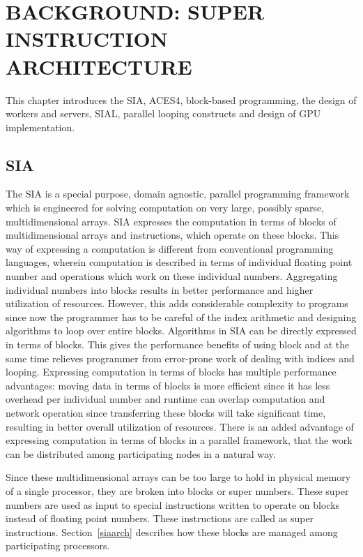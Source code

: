 \chapter{BACKGROUND: SUPER INSTRUCTION ARCHITECTURE} \label{background}

This chapter introduces the SIA, ACES4, block-based
programming, the design of workers and servers, SIAL, parallel looping constructs
and design of GPU implementation.

\section{SIA}
The SIA is a special purpose, domain agnostic, parallel programming framework which
is engineered for solving computation on very large, possibly sparse, multidimensional
arrays. SIA expresses the computation in terms of blocks of multidimensional arrays
and instructions, which operate on these blocks. This way of expressing a computation
is different from conventional programming
languages, wherein computation is described in terms of individual floating point
number and operations which work on these individual numbers. Aggregating
individual numbers into blocks results in better performance and higher utilization
of resources. However, this adds considerable complexity to programs since now
the programmer has to be careful of the index arithmetic and designing algorithms to loop
over entire blocks. Algorithms in SIA can be directly expressed in terms of
blocks. This gives the performance benefits of using block and at the same time relieves
programmer from error-prone work of dealing with indices and looping. Expressing
computation in terms of blocks has multiple performance advantages: moving data in terms
of blocks is more efficient since it has less overhead per individual number
and runtime can overlap computation and network operation since transferring these
blocks will take significant time, resulting in better overall utilization of resources.
There is an added advantage of expressing computation in terms of blocks in a parallel
framework, that the work can be distributed among participating nodes in a natural
way.

Since these multidimensional arrays can be too
large to hold in physical memory of a single processor, they are broken into
blocks or super numbers. These super numbers are used as input to special instructions
written to operate on blocks instead of floating point numbers. These
instructions are called as super instructions. Section~\ref{siaarch} describes how
these blocks are managed among participating processors.

